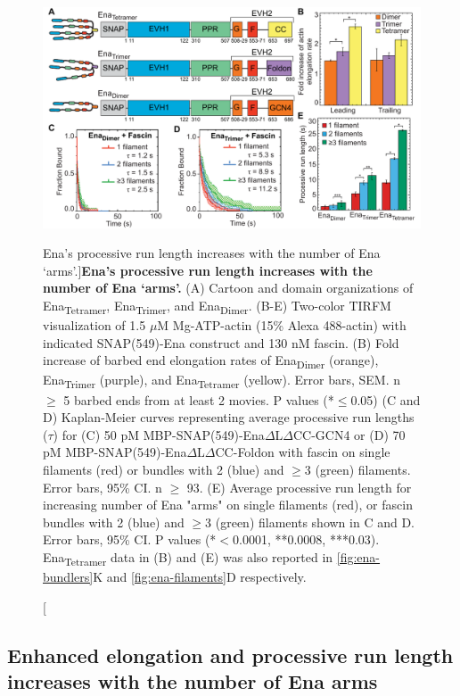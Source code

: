 \begin{figure}
\centering
\includegraphics[width=\textwidth]{img/ch02/Figure_3_elife.pdf}
\caption[Ena's processive run length increases with the number of Ena ‘arms'.]{\textbf{Ena's processive run length increases with the number of Ena ‘arms'.} (A) Cartoon and domain organizations of Ena\textsubscript{Tetramer}, Ena\textsubscript{Trimer}, and Ena\textsubscript{Dimer}. (B-E) Two-color TIRFM visualization of 1.5 $\mu$M Mg-ATP-actin (15\% Alexa 488-actin) with indicated SNAP(549)-Ena construct and 130 nM fascin. (B) Fold increase of barbed end elongation rates of Ena\textsubscript{Dimer} (orange), Ena\textsubscript{Trimer} (purple), and Ena\textsubscript{Tetramer} (yellow). Error bars, SEM. n $\geq$ 5 barbed ends from at least 2 movies. P values (*$\leq$0.05) (C and D) Kaplan-Meier curves representing average processive run lengths ($\tau$) for (C) 50 pM MBP-SNAP(549)-Ena$\Delta$L$\Delta$CC-GCN4 or (D) 70 pM MBP-SNAP(549)-Ena$\Delta$L$\Delta$CC-Foldon with fascin on single filaments (red) or bundles with 2 (blue) and $\geq$3 (green) filaments. Error bars, 95\% CI. n $\geq$ 93. (E) Average processive run length for increasing number of Ena "arms" on single filaments (red), or fascin bundles with 2 (blue) and $\geq$3 (green) filaments shown in C and D. Error bars, 95\% CI. P values (*$<$0.0001, **0.0008, ***0.03). Ena\textsubscript{Tetramer} data in (B) and (E) was also reported in \ref{fig:ena-bundlers}K and \ref{fig:ena-filaments}D respectively. }
\label{fig:ena-arms}
\end{figure}

\subsection{Enhanced elongation and processive run length increases with the number of Ena arms}\label{ena-processive-arms}


